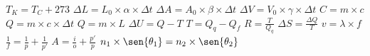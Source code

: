  $T_K = T_C + 273$
$\Delta L = L_0 \times \alpha \times \Delta t$
 $\Delta A = A_0 \times \beta \times \Delta t$
 $\Delta V = V_0 \times \gamma \times \Delta t$
 $C = m \times c$
 $Q = m \times c \times \Delta t$
 $Q = m \times L$
 $\Delta U = Q - T$
 $T = Q_q - Q_f$
 $R = \frac{T}{Q_q}$
 $\Delta S = \frac{\Delta Q}{T}$
 $v = \lambda \times f$
 $\frac{1}{f}=\frac{1}{p}+\frac{1}{p'}$
 $A=\frac{i}{o}+\frac{p'}{p}$
 $n_1 \times \sen{\theta_1} = n_2 \times \sen{\theta_2}$
